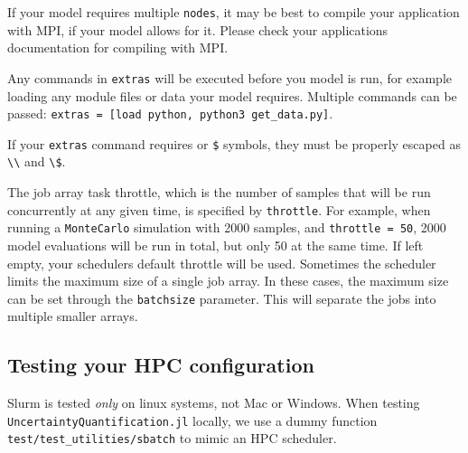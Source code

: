 \begin{tcolorbox}[toptitle=-1mm,bottomtitle=1mm,colback=admonition-note!50!white,colframe=admonition-note,title=\textbf{Compiling with MPI}]
If your model requires multiple \texttt{nodes}, it may be best to compile your application with MPI, if your model allows for it. Please check your application{\textquotesingle}s documentation for compiling with MPI.

\end{tcolorbox}


Any commands in \texttt{extras} will be executed before you model is run, for example loading any module files or data your model requires. Multiple commands can be passed: \texttt{extras = [{\textquotedbl}load python{\textquotedbl}, {\textquotedbl}python3 get\_data.py{\textquotedbl}]}.



\begin{tcolorbox}[toptitle=-1mm,bottomtitle=1mm,colback=admonition-note!50!white,colframe=admonition-note,title=\textbf{Note}]
If your \texttt{extras} command requires \texttt{{\textquotedbl}{\textquotedbl}} or \texttt{\$} symbols, they must be properly escaped as \texttt{{\textbackslash}{\textquotedbl}{\textbackslash}{\textquotedbl}} and \texttt{{\textbackslash}\$}.

\end{tcolorbox}


The job array task throttle, which is the number of samples that will be run concurrently at any given time, is specified by \texttt{throttle}. For example, when running a \texttt{MonteCarlo} simulation with 2000 samples, and \texttt{throttle = 50}, 2000 model evaluations will be run in total, but only 50 at the same time. If left empty, your scheduler{\textquotesingle}s default throttle will be used. Sometimes the scheduler limits the maximum size of a single job array. In these cases, the maximum size can be set through the \texttt{batchsize} parameter. This will separate the jobs into multiple smaller arrays.



\subsection{Testing your HPC configuration}



\label{8854577102267231979}{}


Slurm is tested \emph{only} on linux systems, not Mac or Windows. When testing \texttt{UncertaintyQuantification.jl} locally, we use a dummy function \texttt{test/test\_utilities/sbatch} to mimic an HPC scheduler.



